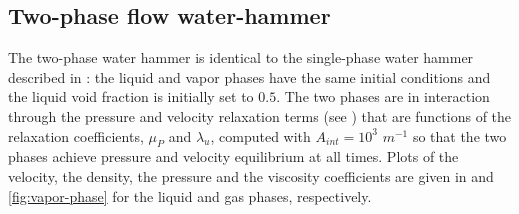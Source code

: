 \documentclass{mc2015}
\begin{document}
\subsection{Two-phase flow water-hammer} \label{sec:two-num-res}
%
The two-phase water hammer is identical to the single-phase water hammer described in : the liquid and vapor phases have the same initial conditions and the liquid void fraction is initially set to $0.5$. The two phases are in interaction through the pressure and velocity relaxation terms (see ) that are functions of the relaxation coefficients, $\mu_P$ and $\lambda_u$, computed with $A_{int} = 10^3$ $m^{-1}$ so that the two phases achieve pressure and velocity equilibrium at all times. Plots of the velocity, the density, the pressure and the viscosity coefficients are given in  and \ref{fig:vapor-phase} for the liquid and gas phases, respectively.
%
\end{document}
